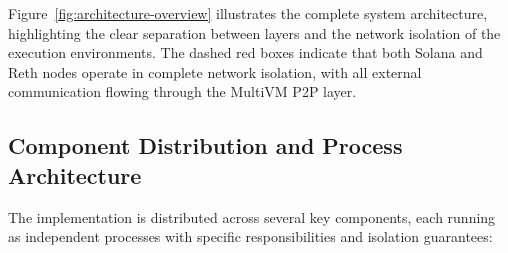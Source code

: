 \documentclass[11pt,a4paper]{article}
\begin{document}
Figure~\ref{fig:architecture-overview} illustrates the complete system architecture, highlighting the clear separation between layers and the network isolation of the execution environments. The dashed red boxes indicate that both Solana and Reth nodes operate in complete network isolation, with all external communication flowing through the MultiVM P2P layer.

\subsection{Component Distribution and Process Architecture}

The implementation is distributed across several key components, each running as independent processes with specific responsibilities and isolation guarantees:
\end{document}

